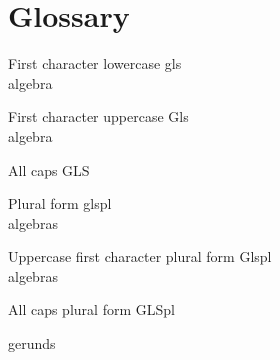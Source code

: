 \documentclass{article}
\begin{document}
\section*{Glossary}

\entryname

First character lowercase gls \\
\gls{algebra}

First character uppercase Gls \\
\Gls{algebra}

All caps GLS \\

Plural form glspl \\
\glspl{algebra}

Uppercase first character plural form Glspl \\
\Glspl{algebra}

All caps plural form GLSpl \\


\gls{gerunds}
\end{document}
